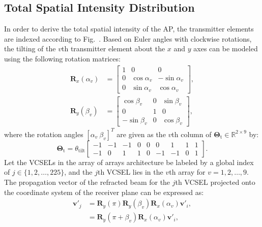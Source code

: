 \documentclass[lettersize,journal]{IEEEtran}
\begin{document}
\subsection{Total Spatial Intensity Distribution}
In order to derive the total spatial intensity of the \ac{AP}, the transmitter elements are indexed according to Fig.~. Based on Euler angles with clockwise rotations, the tilting of the $v$th transmitter element about the $x$ and $y$ axes can be modeled using the following rotation matrices:
%
\begin{subequations}\label{Eq:RotationMatrices}
\begin{align}
\mathbf{R}_{x}(\alpha_v) &= 
\left[\begin{matrix}
1 & 0 & 0 \\
0 & \cos\alpha_v & -\sin\alpha_v \\
0 & \sin\alpha_v & \cos\alpha_v
\end{matrix}\right], \label{Eq:RotationMatrix_x}\\
\mathbf{R}_{y}(\beta_v) &= 
\left[\begin{matrix}
\cos\beta_v & 0 & \sin\beta_v \\
0 & 1 & 0 \\ 
-\sin\beta_v & 0 & \cos\beta_v
\end{matrix}\right], \label{Eq:RotationMatrix_y}
\end{align}
\end{subequations}
%
where the rotation angles $\left[\alpha_v~\beta_v\right]^T$ are given as the $v$th column of $\mathbf{\Theta}_\mathrm{t}\in\mathbb{R}^{2\times9}$ by:
%
\begin{equation}
    \mathbf{\Theta}_\mathrm{t} = \theta_\mathrm{tilt}\left[\begin{matrix}
                            -1 & -1 & -1 & 0 & 0  & 0  & 1  & 1 & 1 \\ 
                            -1 & 0  & 1  & 1 & 0  & -1 & -1 & 0 & 1
                            \end{matrix}\right].
\end{equation}
%
Let the \acp{VCSEL} in the array of arrays architecture be labeled by a global index of $j\in\{1,2,\dots,225\}$, and the $j$th \ac{VCSEL} lies in the $v$th array for $v=1,2,\dots,9$. The propagation vector of the refracted beam for the $j$th \ac{VCSEL} projected onto the coordinate system of the receiver plane can be expressed as:
\begin{equation}
    \begin{aligned}
    \mathbf{v}'_{j} &= \mathbf{R}_{y}(\pi)\mathbf{R}_{y}(\beta_v)\mathbf{R}_{x}(\alpha_v)\mathbf{v}'_i, \\
                   &= \mathbf{R}_{y}(\pi+\beta_v)\mathbf{R}_{x}(\alpha_v)\mathbf{v}'_i,
    \end{aligned}
\end{equation}
\end{document}
